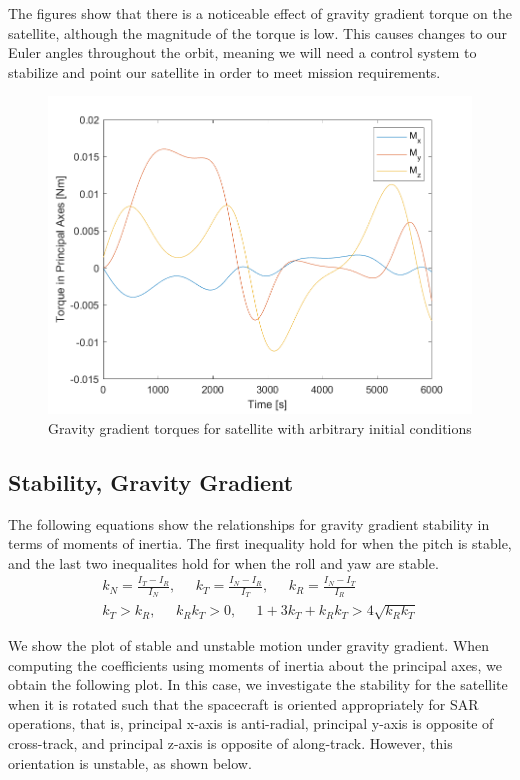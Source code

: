 The figures show that there is a noticeable effect of gravity gradient torque on the satellite, although the magnitude of the torque is low. This causes changes to our Euler angles throughout the orbit, meaning we will need a control system to stabilize and point our satellite in order to meet mission requirements.

\begin{figure}[H]
\centering
\includegraphics[scale=0.6]{Images/ps4_problem4e_torque.png}
\caption{Gravity gradient torques for satellite with arbitrary initial conditions}
\label{fig:ps4_problem4e_torque}
\end{figure}

\subsection{Stability, Gravity Gradient}

The following equations show the relationships for gravity gradient stability in terms of moments of inertia. The first inequality hold for when the pitch is stable, and the last two inequalites hold for when the roll and yaw are stable.
\begin{align*}
    k_N = \frac{I_T - I_R}{I_N}, \;\;\;\;\;
    k_T = \frac{I_N - I_R}{I_T}, \;\;\;\;\;
    k_R = \frac{I_N - I_T}{I_R} \\
    k_T > k_R, \;\;\;\;\;
    k_R k_T > 0, \;\;\;\;\;
    1 + 3 k_T + k_R k_T > 4 \sqrt{k_R k_T}
\end{align*}

We show the plot of stable and unstable motion under gravity gradient. When computing the coefficients using moments of inertia about the principal axes, we obtain the following plot. In this case, we investigate the stability for the satellite when it is rotated such that the spacecraft is oriented appropriately for SAR operations, that is, principal x-axis is anti-radial, principal y-axis is opposite of cross-track, and principal z-axis is opposite of along-track. However, this orientation is unstable, as shown below.

